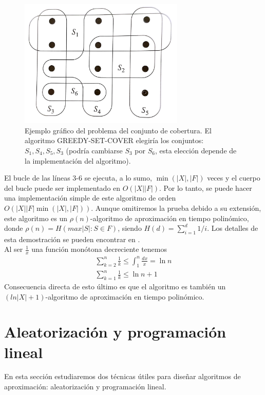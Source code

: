 \documentclass{article}
\begin{document}
\begin{figure}[H]
  \centering
    \includegraphics[width=0.7\textwidth]{set-cover}
  \caption{Ejemplo gráfico del problema del conjunto de cobertura. 
El algoritmo GREEDY-SET-COVER elegiría los conjuntos: $S_1, S_4, S_5, S_3$ (podría cambiarse $S_3$ por $S_6$, esta elección depende de la implementación del algoritmo).}
\end{figure}

El bucle de las líneas 3-6 se ejecuta, a lo sumo, $\min(|X|,|F|)$ veces y el cuerpo del bucle puede ser implementado en $O(|X||F|)$. Por lo tanto, se puede hacer una implementación simple de este algoritmo de orden $O(|X||F|\min(|X|,|F|))$. Aunque omitiremos la prueba debido a su extensión, este algoritmo es un $\rho(n)$-algoritmo de aproximación en tiempo polinómico, donde $\rho(n) = H(max{|S|:S \in F})$, siendo $H(d) = \sum_{i=1}^{d}1/i$. Los detalles de esta demostración se pueden encontrar en \cite[pág 1120]{cormen}.\\

Al ser $\frac{1}{x}$ una función monótona decreciente tenemos
\begin{gather*}
	\sum_{k=2}^{n}\frac{1}{k} \leq \int_{1}^{n}\frac{dx}{x} = \ln n \\ 	
	\sum_{k=1}^{n}\frac{1}{k} \leq  \ln n + 1
\end{gather*}
 Consecuencia directa de esto último es que el algoritmo es también un $(ln|X| + 1)$-algoritmo de aproximación en tiempo polinómico.

\section{Aleatorización y programación lineal}
En esta sección estudiaremos dos técnicas útiles para diseñar algoritmos de aproximación: aleatorización y programación lineal.
\end{document}
